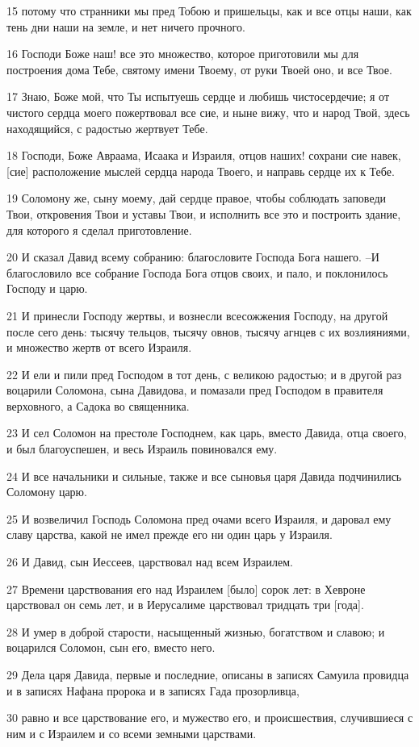 \par 15 потому что странники мы пред Тобою и пришельцы, как и все отцы наши, как тень дни наши на земле, и нет ничего прочного.
\par 16 Господи Боже наш! все это множество, которое приготовили мы для построения дома Тебе, святому имени Твоему, от руки Твоей оно, и все Твое.
\par 17 Знаю, Боже мой, что Ты испытуешь сердце и любишь чистосердечие; я от чистого сердца моего пожертвовал все сие, и ныне вижу, что и народ Твой, здесь находящийся, с радостью жертвует Тебе.
\par 18 Господи, Боже Авраама, Исаака и Израиля, отцов наших! сохрани сие навек, [сие] расположение мыслей сердца народа Твоего, и направь сердце их к Тебе.
\par 19 Соломону же, сыну моему, дай сердце правое, чтобы соблюдать заповеди Твои, откровения Твои и уставы Твои, и исполнить все это и построить здание, для которого я сделал приготовление.
\par 20 И сказал Давид всему собранию: благословите Господа Бога нашего. --И благословило все собрание Господа Бога отцов своих, и пало, и поклонилось Господу и царю.
\par 21 И принесли Господу жертвы, и вознесли всесожжения Господу, на другой после сего день: тысячу тельцов, тысячу овнов, тысячу агнцев с их возлияниями, и множество жертв от всего Израиля.
\par 22 И ели и пили пред Господом в тот день, с великою радостью; и в другой раз воцарили Соломона, сына Давидова, и помазали пред Господом в правителя верховного, а Садока во священника.
\par 23 И сел Соломон на престоле Господнем, как царь, вместо Давида, отца своего, и был благоуспешен, и весь Израиль повиновался ему.
\par 24 И все начальники и сильные, также и все сыновья царя Давида подчинились Соломону царю.
\par 25 И возвеличил Господь Соломона пред очами всего Израиля, и даровал ему славу царства, какой не имел прежде его ни один царь у Израиля.
\par 26 И Давид, сын Иессеев, царствовал над всем Израилем.
\par 27 Времени царствования его над Израилем [было] сорок лет: в Хевроне царствовал он семь лет, и в Иерусалиме царствовал тридцать три [года].
\par 28 И умер в доброй старости, насыщенный жизнью, богатством и славою; и воцарился Соломон, сын его, вместо него.
\par 29 Дела царя Давида, первые и последние, описаны в записях Самуила провидца и в записях Нафана пророка и в записях Гада прозорливца,
\par 30 равно и все царствование его, и мужество его, и происшествия, случившиеся с ним и с Израилем и со всеми земными царствами.


